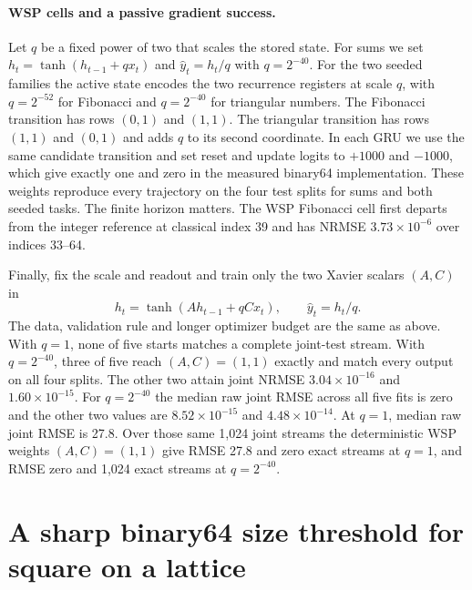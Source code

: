 \paragraph{WSP cells and a passive gradient success.}
Let \(q\) be a fixed power of two that scales the stored state. For sums we set \(h_t=\tanh(h_{t-1}+q x_t)\) and \(\hat y_t=h_t/q\) with \(q=2^{-40}\). For the two seeded families the active state encodes the two recurrence registers at scale \(q\), with \(q=2^{-52}\) for Fibonacci and \(q=2^{-40}\) for triangular numbers. The Fibonacci transition has rows \((0,1)\) and \((1,1)\). The triangular transition has rows \((1,1)\) and \((0,1)\) and adds \(q\) to its second coordinate. In each GRU we use the same candidate transition and set reset and update logits to \(+1000\) and \(-1000\), which give exactly one and zero in the measured binary64 implementation. These weights reproduce every trajectory on the four test splits for sums and both seeded tasks. The finite horizon matters. The WSP Fibonacci cell first departs from the integer reference at classical index 39 and has NRMSE \(3.73\times10^{-6}\) over indices 33--64.

Finally, fix the scale and readout and train only the two Xavier scalars \((A,C)\) in
\[
             h_t=\tanh(Ah_{t-1}+qC x_t),\qquad \hat y_t=h_t/q .
\]
The data, validation rule and longer optimizer budget are the same as above. With \(q=1\), none of five starts matches a complete joint-test stream. With \(q=2^{-40}\), three of five reach \((A,C)=(1,1)\) exactly and match every output on all four splits. The other two attain joint NRMSE \(3.04\times10^{-16}\) and \(1.60\times10^{-15}\). For \(q=2^{-40}\) the median raw joint RMSE across all five fits is zero and the other two values are \(8.52\times10^{-15}\) and \(4.48\times10^{-14}\). At \(q=1\), median raw joint RMSE is 27.8. Over those same 1,024 joint streams the deterministic WSP weights \((A,C)=(1,1)\) give RMSE 27.8 and zero exact streams at \(q=1\), and RMSE zero and 1,024 exact streams at \(q=2^{-40}\).

\section{A sharp binary64 size threshold for square on a lattice}
\label{app:lattice-square}

